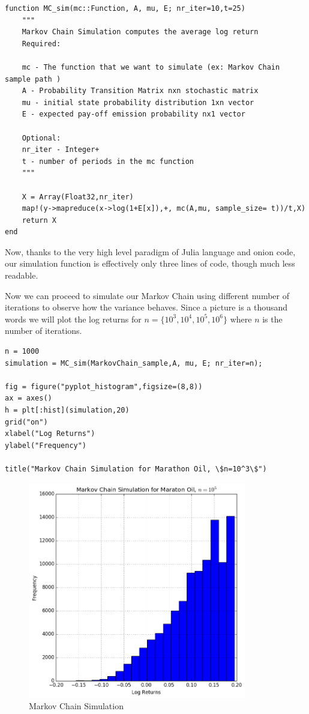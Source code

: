 \documentclass[a4paper,12pt]{article}
\theoremstyle{definition}
\begin{document}
\begin{lstlisting}
function MC_sim(mc::Function, A, mu, E; nr_iter=10,t=25)
    """
    Markov Chain Simulation computes the average log return
    Required:
    
    mc - The function that we want to simulate (ex: Markov Chain sample path )
    A - Probability Transition Matrix nxn stochastic matrix
    mu - initial state probability distribution 1xn vector
    E - expected pay-off emission probability nx1 vector
    
    Optional:
    nr_iter - Integer+
    t - number of periods in the mc function
    """
    
    X = Array(Float32,nr_iter)
    map!(y->mapreduce(x->log(1+E[x]),+, mc(A,mu, sample_size= t))/t,X)
    return X
end
\end{lstlisting}
Now, thanks to the very high level paradigm of Julia language and onion code, our simulation function is effectively only three lines of code, though much less readable. 

Now we can proceed to simulate our Markov Chain using different number of iterations to observe how the variance behaves. Since a picture is a thousand words we will plot the log returns for $n= \{10^3, 10^4, 10^5, 10^6 \}$ where $n$ is the number of iterations. 
\begin{lstlisting}
n = 1000
simulation = MC_sim(MarkovChain_sample,A, mu, E; nr_iter=n);

fig = figure("pyplot_histogram",figsize=(8,8))
ax = axes()
h = plt[:hist](simulation,20)
grid("on")
xlabel("Log Returns")
ylabel("Frequency")

title("Markov Chain Simulation for Marathon Oil, \$n=10^3\$")
\end{lstlisting}

\begin{figure}[h]
\caption{Markov Chain Simulation}
\label{fig:MCSim5}
\includegraphics[width=0.85\textwidth]{mcLogReturns_5.png} 
\centering
\end{figure}
\end{document}
